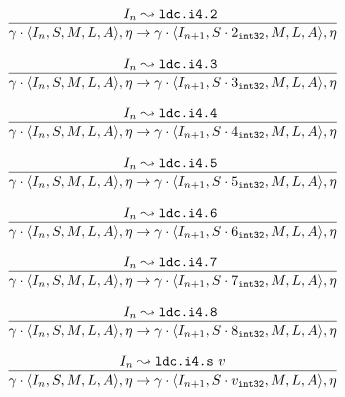 \documentclass[declaration,shortabstract,english,mgr]{iithesis}
\newcommand{\mstate}[5] {
	\langle#1, #2, #3, #4, #5\rangle
}
\newcommand{\ipointsto}[3] {
	#1 \leadsto \texttt{#2} \text{ } #3
}
\newcommand{\sval}[2] {
	#1_\texttt{#2}
}
\begin{document}
\begin{equation}
\label{eq:semantics_ldci42}
	\infer{
		\gamma \cdot \mstate{I_n}{S}{M}{L}{A}, \eta
			\rightarrow
		\gamma \cdot \mstate{I_{n+1}}{S \cdot \sval{2}{int32}}{M}{L}{A}, \eta
	}
	{\ipointsto{I_n}{ldc.i4.2}}
\end{equation}

\begin{equation}
\label{eq:semantics_ldci43}
	\infer{
		\gamma \cdot \mstate{I_n}{S}{M}{L}{A}, \eta
			\rightarrow
		\gamma \cdot \mstate{I_{n+1}}{S \cdot \sval{3}{int32}}{M}{L}{A}, \eta
	}
	{\ipointsto{I_n}{ldc.i4.3}}
\end{equation}

\begin{equation}
\label{eq:semantics_ldci44}
	\infer{
		\gamma \cdot \mstate{I_n}{S}{M}{L}{A}, \eta
			\rightarrow
		\gamma \cdot \mstate{I_{n+1}}{S \cdot \sval{4}{int32}}{M}{L}{A}, \eta
	}
	{\ipointsto{I_n}{ldc.i4.4}}
\end{equation}

\begin{equation}
\label{eq:semantics_ldci45}
	\infer{
		\gamma \cdot \mstate{I_n}{S}{M}{L}{A}, \eta
			\rightarrow
		\gamma \cdot \mstate{I_{n+1}}{S \cdot \sval{5}{int32}}{M}{L}{A}, \eta
	}
	{\ipointsto{I_n}{ldc.i4.5}}
\end{equation}

\begin{equation}
\label{eq:semantics_ldci46}
	\infer{
		\gamma \cdot \mstate{I_n}{S}{M}{L}{A}, \eta
			\rightarrow
		\gamma \cdot \mstate{I_{n+1}}{S \cdot \sval{6}{int32}}{M}{L}{A}, \eta
	}
	{\ipointsto{I_n}{ldc.i4.6}}
\end{equation}

\begin{equation}
\label{eq:semantics_ldci47}
	\infer{
		\gamma \cdot \mstate{I_n}{S}{M}{L}{A}, \eta
			\rightarrow
		\gamma \cdot \mstate{I_{n+1}}{S \cdot \sval{7}{int32}}{M}{L}{A}, \eta
	}
	{\ipointsto{I_n}{ldc.i4.7}}
\end{equation}

\begin{equation}
\label{eq:semantics_ldci48}
	\infer{
		\gamma \cdot \mstate{I_n}{S}{M}{L}{A}, \eta
			\rightarrow
		\gamma \cdot \mstate{I_{n+1}}{S \cdot \sval{8}{int32}}{M}{L}{A}, \eta
	}
	{\ipointsto{I_n}{ldc.i4.8}}
\end{equation}

\begin{equation}
\label{eq:semantics_ldci4s}
	\infer{
		\gamma \cdot \mstate{I_n}{S}{M}{L}{A}, \eta
			\rightarrow
		\gamma \cdot \mstate{I_{n+1}}{S \cdot \sval{v}{int32}}{M}{L}{A}, \eta
	}
	{\ipointsto{I_n}{ldc.i4.s}{v}}
\end{equation}
\end{document}

